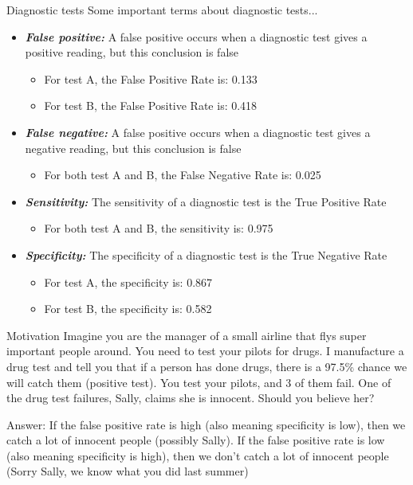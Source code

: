 \documentclass[xcolor=dvipsnames]{beamer}
\begin{document}
\begin{frame}{Diagnostic tests}
Some important terms about diagnostic tests...
	\begin{itemize}
		\item \textbf{\emph{False positive:}} A false positive occurs when a diagnostic test gives a positive reading, but this conclusion is false
		\begin{itemize}
			\item For test A, the False Positive Rate is: 0.133
			\item For test B, the False Positive Rate is: 0.418
		\end{itemize}
		\item \textbf{\emph{False negative:}} A false positive occurs when a diagnostic test gives a negative reading, but this conclusion is false
		\begin{itemize}
			\item For both test A and B, the False Negative Rate is: 0.025
		\end{itemize}
		\item \textbf{\emph{Sensitivity:}} The sensitivity of a diagnostic test is the True Positive Rate
		\begin{itemize}
			\item For both test A and B, the sensitivity is: 0.975
		\end{itemize}
		\item \textbf{\emph{Specificity:}} The specificity of a diagnostic test is the True Negative Rate
		\begin{itemize}
			\item For test A, the specificity is: 0.867
			\item For test B, the specificity is: 0.582
		\end{itemize}
	\end{itemize}
\end{frame}

\begin{frame}{Motivation}
Imagine you are the manager of a small airline that flys super important people around. You need to test your pilots for drugs. I manufacture a drug test and tell you that if a person has done drugs, there is a 97.5\% chance we will catch them (positive test). You test your pilots, and 3 of them fail. One of the drug test failures, Sally, claims she is innocent. Should you believe her? 

\vspace{10pt}
Answer: If the false positive rate is high (also meaning specificity is low), then we catch a lot of innocent people (possibly Sally). If the false positive rate is low (also meaning specificity is high), then we don't catch a lot of innocent people (Sorry Sally, we know what you did last summer)
\end{frame}
\end{document}
